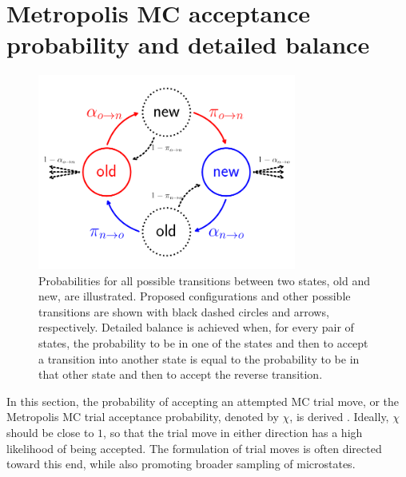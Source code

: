 \documentclass[
  9pt,
  bestpractices,
]{livecoms}
\begin{document}
\section{\label{sec:detailed_balance}Metropolis MC acceptance probability and detailed balance}

\begin{figure}
\begin{centering}
\includegraphics[width=8.5cm]{../figures/detailed_balance.pdf}
\caption{
Probabilities for all possible transitions between two states, old and new, are illustrated.
Proposed configurations and other possible transitions are shown with black dashed circles and arrows, respectively.
Detailed balance is achieved when, for every pair of states, the probability to be in one of the states and then to accept a transition into another state is equal to the probability to be in that other state and then to accept the reverse transition.
}
\label{fig:detailed_balance}
\end{centering}
\end{figure}

In this section, the probability of accepting an attempted MC trial move, or the Metropolis MC trial acceptance probability, denoted by $\chi$, is derived \cite{metropolis_equation_1953, hastings_monte_1970, kofke_monte_1988, allen_computer_1989, frenkel_understanding_2002}.
Ideally, $\chi$ should be close to $1$, so that the trial move in either direction has a high likelihood of being accepted.
The formulation of trial moves is often directed toward this end, while also promoting broader sampling of microstates.
\end{document}
